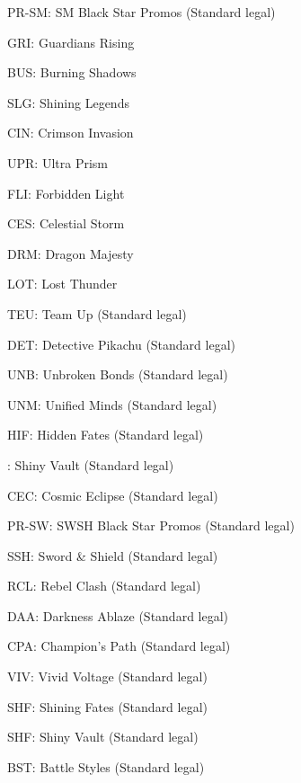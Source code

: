 \documentclass[12pt,twocolumn]{article}
\begin{document}
PR-SM: SM Black Star Promos
(Standard legal)

GRI: Guardians Rising

BUS: Burning Shadows

SLG: Shining Legends

CIN: Crimson Invasion

UPR: Ultra Prism

FLI: Forbidden Light

CES: Celestial Storm

DRM: Dragon Majesty

LOT: Lost Thunder

TEU: Team Up
(Standard legal)

DET: Detective Pikachu
(Standard legal)

UNB: Unbroken Bonds
(Standard legal)

UNM: Unified Minds
(Standard legal)

HIF: Hidden Fates
(Standard legal)

: Shiny Vault
(Standard legal)

CEC: Cosmic Eclipse
(Standard legal)

PR-SW: SWSH Black Star Promos
(Standard legal)

SSH: Sword \& Shield
(Standard legal)

RCL: Rebel Clash
(Standard legal)

DAA: Darkness Ablaze
(Standard legal)

CPA: Champion's Path
(Standard legal)

VIV: Vivid Voltage
(Standard legal)

SHF: Shining Fates
(Standard legal)

SHF: Shiny Vault
(Standard legal)

BST: Battle Styles
(Standard legal)
\end{document}
